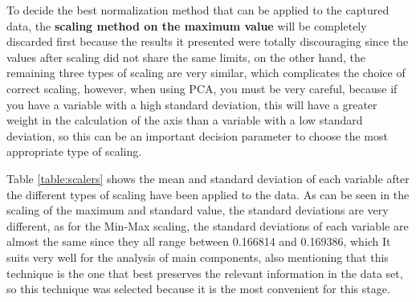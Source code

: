 To decide the best normalization method that can be applied to the captured data, the \textbf{scaling method on the maximum value} will be completely discarded first because the results it presented were totally discouraging since the values after scaling did not share the same limits, on the other hand, the remaining three types of scaling are very similar, which complicates the choice of correct scaling, however, when using PCA, you must be very careful, because if you have a variable with a high standard deviation, this will have a greater weight in the calculation of the axis than a variable with a low standard deviation, so this can be an important decision parameter to choose the most appropriate type of scaling.

\vspace{5mm} %

Table \ref{table:scalers} shows the mean and standard deviation of each variable after the different types of scaling have been applied to the data. As can be seen in the scaling of the maximum and standard value, the standard deviations are very different, as for the Min-Max scaling, the standard deviations of each variable are almost the same since they all range between 0.166814 and 0.169386, which It suits very well for the analysis of main components, also mentioning that this technique is the one that best preserves the relevant information in the data set, so this technique was selected because it is the most convenient for this stage.

